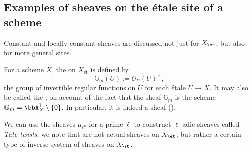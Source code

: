 



\subsection{Examples of sheaves on the \'etale site of a scheme}

Constant and locally constant sheaves are discussed not just for $X_{\et}$, but also for more general sites.










\begin{definition}
For a scheme $X$, the   on $X_{\text{ét}}$ is defined by
$$ \mathbb{G}_m(U) := \mathcal{O}_U(U)^\times, $$
the group of invertible regular functions on $U$ for each étale $U \to X$. It may also be called the , on account of the fact that the sheaf $\mathbb{G}_m$ is  the scheme $\mathbb{G}_m = \bbA_X^1 \setminus \{0\}$.  In particular, it is indeed a sheaf ().
\end{definition}




We can use the sheaves $\mu_{\ell^n}$ for a prime $\ell$ to construct $\ell$-adic sheaves  called \emph{Tate twists}; we note that  are not actual sheaves on $X_{\et}$, but rather a certain type of inverse system of sheaves on $X_{\et}$. 




